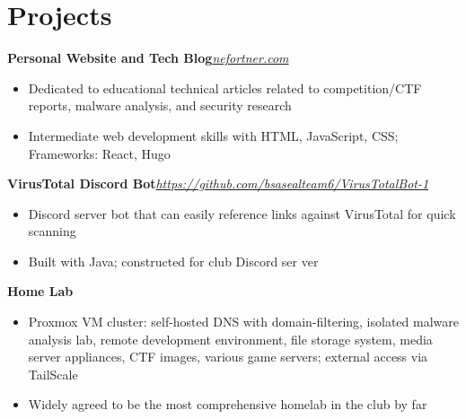 \documentclass{article}
\newcommand{\topLevelProjectItem}[2]{
    \textbf{#1}\hfill \emph{#2}\newline
    \vspace{-18pt}\begin{itemize}
}
\newcommand{\topLevelItemEnd}{\end{itemize}\vspace{5pt}}
\newcommand{\lowLevelItem}[1]{
    \item\small{#1}\vspace{-8pt}
}
\begin{document}
    \section*{Projects}
        \topLevelProjectItem{Personal Website and Tech Blog}{\href{https://nefortner.com}{nefortner.com}}
            \lowLevelItem{Dedicated to educational technical articles related to competition/CTF reports, malware analysis, and security research}
            \lowLevelItem{Intermediate web development skills with HTML, JavaScript, CSS; Frameworks: React, Hugo}
        \topLevelItemEnd
        \topLevelProjectItem{VirusTotal Discord Bot}{\href{https://github.com/bsasealteam6/VirusTotalBot-1}{https://github.com/bsasealteam6/VirusTotalBot-1}}
            \lowLevelItem{Discord server bot that can easily reference links against VirusTotal for quick scanning}
            \lowLevelItem{Built with Java; constructed for club Discord ser}ver
        \topLevelItemEnd
        \topLevelProjectItem{Home Lab}{{}} %
            \lowLevelItem{Proxmox VM cluster: self-hosted DNS with domain-filtering, isolated malware analysis lab, remote development environment, file storage system, media server appliances, CTF images, various game servers; external access via TailScale}
            \lowLevelItem{Widely agreed to be the most comprehensive homelab in the club by far}
        \topLevelItemEnd
\end{document}
